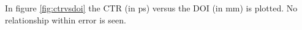 In figure \ref{fig:ctrvsdoi} the CTR (in ps) versus the DOI (in mm) is plotted. No relationship within error is seen.